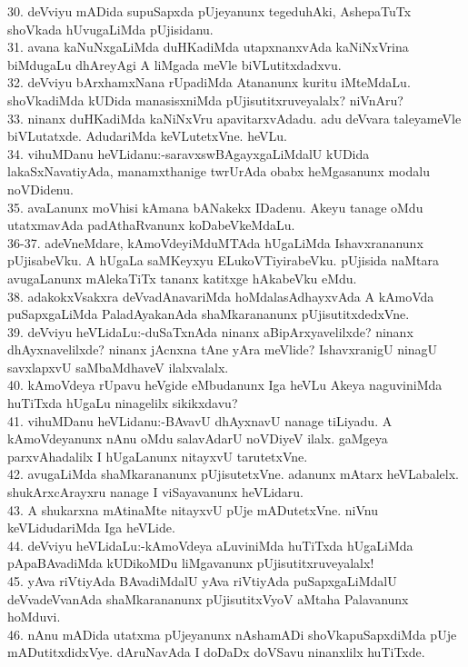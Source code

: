\documentclass{article}
\begin{document}
30. deVviyu mADida supuSapxda pUjeyanunx tegeduhAki, AshepaTuTx shoVkada hUvugaLiMda pUjisidanu.\\
31. avana kaNuNxgaLiMda duHKadiMda utapxnanxvAda kaNiNxVrina biMdugaLu dhAreyAgi A liMgada meVle biVLutitxdadxvu.\\
32. deVviyu bArxhamxNana rUpadiMda Atananunx kuritu iMteMdaLu. shoVkadiMda kUDida manasisxniMda pUjisutitxruveyalalx? niVnAru?\\
33. ninanx duHKadiMda kaNiNxVru apavitarxvAdadu. adu deVvara taleyameVle biVLutatxde. AdudariMda keVLutetxVne. heVLu.\\
34. vihuMDanu heVLidanu:-saravxswBAgayxgaLiMdalU kUDida lakaSxNavatiyAda, manamxthanige twrUrAda obabx heMgasanunx modalu noVDidenu.\\
35. avaLanunx moVhisi kAmana bANakekx IDadenu. Akeyu tanage oMdu utatxmavAda padAthaRvanunx koDabeVkeMdaLu.\\
36-37. adeVneMdare, kAmoVdeyiMduMTAda hUgaLiMda Ishavxrananunx pUjisabeVku. A hUgaLa saMKeyxyu ELukoVTiyirabeVku. pUjisida naMtara avugaLanunx mAlekaTiTx tananx katitxge hAkabeVku eMdu.\\
38. adakokxVsakxra deVvadAnavariMda hoMdalasAdhayxvAda A kAmoVda puSapxgaLiMda PaladAyakanAda shaMkarananunx pUjisutitxdedxVne.\\
39. deVviyu heVLidaLu:-duSaTxnAda ninanx aBipArxyavelilxde? ninanx dhAyxnavelilxde? ninanx jAcnxna tAne yAra meVlide? IshavxranigU ninagU savxlapxvU saMbaMdhaveV ilalxvalalx.\\
40. kAmoVdeya rUpavu heVgide eMbudanunx Iga heVLu Akeya naguviniMda huTiTxda hUgaLu ninagelilx sikikxdavu?\\
41. vihuMDanu heVLidanu:-BAvavU dhAyxnavU nanage tiLiyadu. A kAmoVdeyanunx nAnu oMdu salavAdarU noVDiyeV ilalx. gaMgeya parxvAhadalilx I hUgaLanunx nitayxvU tarutetxVne.\\
42. avugaLiMda shaMkarananunx pUjisutetxVne. adanunx mAtarx heVLabalelx. shukArxcArayxru nanage I viSayavanunx heVLidaru.\\
43. A shukarxna mAtinaMte nitayxvU pUje mADutetxVne. niVnu keVLidudariMda Iga heVLide.\\
44. deVviyu heVLidaLu:-kAmoVdeya aLuviniMda huTiTxda hUgaLiMda pApaBAvadiMda kUDikoMDu liMgavanunx pUjisutitxruveyalalx!\\
45. yAva riVtiyAda BAvadiMdalU yAva riVtiyAda puSapxgaLiMdalU deVvadeVvanAda shaMkarananunx pUjisutitxVyoV aMtaha Palavanunx hoMduvi.\\
46. nAnu mADida utatxma pUjeyanunx nAshamADi shoVkapuSapxdiMda pUje mADutitxdidxVye. dAruNavAda I doDaDx doVSavu ninanxlilx huTiTxde.\\
\end{document}
